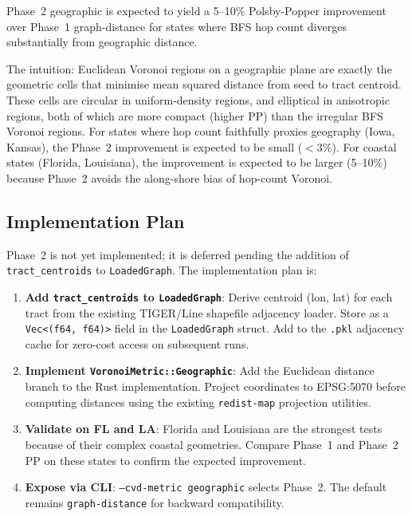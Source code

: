 Phase~2 geographic \cvd{} is expected to yield a 5--10\% Polsby-Popper
improvement over Phase~1 graph-distance \cvd{} for states where BFS
hop count diverges substantially from geographic distance.

The intuition: Euclidean Voronoi regions on a geographic plane are exactly
the geometric cells that minimise mean squared distance from seed to tract
centroid. These cells are circular in uniform-density regions, and elliptical
in anisotropic regions, both of which are more compact (higher PP) than the
irregular BFS Voronoi regions.
For states where hop count faithfully proxies geography (Iowa, Kansas),
the Phase~2 improvement is expected to be small ($<3\%$).
For coastal states (Florida, Louisiana), the improvement is expected to be
larger (5--10\%) because Phase~2 avoids the along-shore bias of hop-count
Voronoi.

\subsection{Implementation Plan}

Phase~2 \cvd{} is not yet implemented; it is deferred pending the addition
of \texttt{tract\_centroids} to \texttt{LoadedGraph}.
The implementation plan is:

\begin{enumerate}
\item \textbf{Add \texttt{tract\_centroids} to \texttt{LoadedGraph}}:
  Derive centroid (lon, lat) for each tract from the existing TIGER/Line
  shapefile adjacency loader.
  Store as a \texttt{Vec<(f64, f64)>} field in the \texttt{LoadedGraph} struct.
  Add to the \texttt{.pkl} adjacency cache for zero-cost access on subsequent runs.

\item \textbf{Implement \texttt{VoronoiMetric::Geographic}}:
  Add the Euclidean distance branch to the \cvd{} Rust implementation.
  Project coordinates to EPSG:5070 before computing distances using the
  existing \texttt{redist-map} projection utilities.

\item \textbf{Validate on FL and LA}:
  Florida and Louisiana are the strongest tests because of their complex
  coastal geometries.
  Compare Phase~1 and Phase~2 \cvd{} PP on these states to confirm the
  expected improvement.

\item \textbf{Expose via CLI}:
  \texttt{--cvd-metric geographic} selects Phase~2.
  The default remains \texttt{graph-distance} for backward compatibility.
\end{enumerate}

